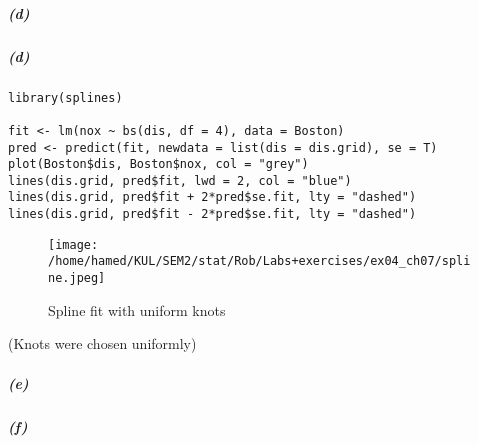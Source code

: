 \documentclass[11pt]{article}
\begin{document}
\subparagraph{(d)}
\subparagraph{(d)}
\begin{lstlisting}
library(splines)

fit <- lm(nox ~ bs(dis, df = 4), data = Boston)
pred <- predict(fit, newdata = list(dis = dis.grid), se = T)
plot(Boston$dis, Boston$nox, col = "grey")
lines(dis.grid, pred$fit, lwd = 2, col = "blue")
lines(dis.grid, pred$fit + 2*pred$se.fit, lty = "dashed")
lines(dis.grid, pred$fit - 2*pred$se.fit, lty = "dashed")
\end{lstlisting}

\begin{figure}[H]
\centering
\texttt{[image: /home/hamed/KUL/SEM2/stat/Rob/Labs+exercises/ex04\_ch07/spline.jpeg]}
\caption{Spline fit with uniform knots}
\end{figure}
(Knots were chosen uniformly)
\subparagraph{(e)}
\subparagraph{(f)}
\end{document}
